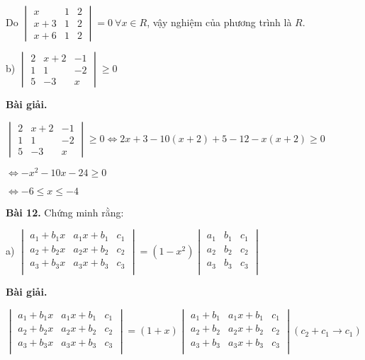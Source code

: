 \documentclass[12pt]{report}
\begin{document}
Do $\begin{vmatrix}
	x & 1 & 2 \\
	x+3 & 1 & 2 \\
	x+6 & 1 & 2
\end{vmatrix} = 0\ \forall x \in R$, vậy nghiệm của phương trình là $R$.

b) $\begin{vmatrix}
	2 & x+2 & -1 \\
	1 & 1 & -2 \\
	5 & -3 & x
\end{vmatrix} \geq 0$

\textbf{Bài giải.} 

$\begin{vmatrix}
	2 & x+2 & -1 \\
	1 & 1 & -2 \\
	5 & -3 & x
\end{vmatrix} \geq 0 \Leftrightarrow 2x+3-10(x+2)+5-12-x(x+2) \geq 0$

$\Leftrightarrow -x^2 -10x - 24 \geq 0$ 

$\Leftrightarrow -6 \leq x \leq -4$ 

\textbf{Bài 12.} Chứng minh rằng: 

a) $\begin{vmatrix}
	a_1+b_1x & a_1x+b_1 & c_1 \\
	a_2+b_2x & a_2x+b_2 & c_2 \\
	a_3+b_3x & a_3x+b_3 & c_3 \\
\end{vmatrix} = (1-x^2) \begin{vmatrix}
	a_1 & b_1 & c_1 \\ 
	a_2 & b_2 & c_2 \\
	a_3 & b_3 & c_3 \\
\end{vmatrix}$

\textbf{Bài giải.} 

$\begin{vmatrix}
	a_1+b_1x & a_1x+b_1 & c_1 \\
	a_2+b_2x & a_2x+b_2 & c_2 \\
	a_3+b_3x & a_3x+b_3 & c_3 \\
\end{vmatrix} = (1+x) \begin{vmatrix}
a_1+b_1 & a_1x+b_1 & c_1 \\
a_2+b_2 & a_2x+b_2 & c_2 \\
a_3+b_3 & a_3x+b_3 & c_3 \\
\end{vmatrix} (c_2+c_1 \to c_1)$
\end{document}
